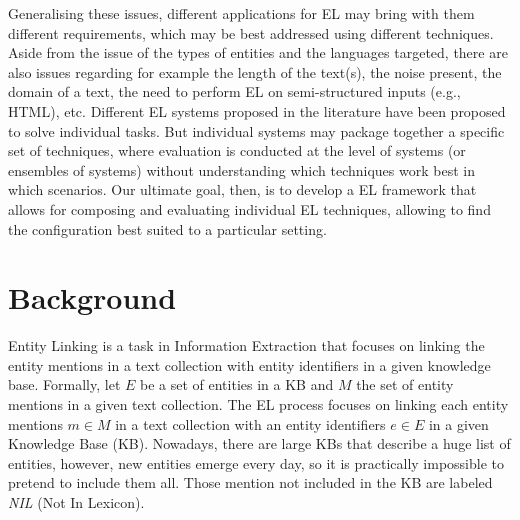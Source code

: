 \documentclass[sigconf]{acmart}
\begin{document}
Generalising these issues, different applications for EL may bring with them different requirements, which may be best addressed using different techniques. Aside from the issue of the types of entities and the languages targeted, there are also issues regarding for example the length of the text(s), the noise present, the domain of a text, the need to perform EL on semi-structured inputs (e.g., HTML), etc. Different EL systems proposed in the literature have been proposed to solve individual tasks. But individual systems may package together a specific set of techniques, where evaluation is conducted at the level of systems (or ensembles of systems) without understanding which techniques work best in which scenarios. Our ultimate goal, then, is to develop a EL framework that allows for composing and evaluating individual EL techniques, allowing to find the configuration best suited to a particular setting.



\section{Background}
Entity Linking is a task in Information Extraction that focuses on linking the entity mentions in a text collection with entity identifiers in a given knowledge base. Formally, let $E$ be a set of entities in a KB and $M$ the set of entity mentions in a given text collection. The EL process focuses on linking each entity mentions $m\in{}M$ in a text collection with an entity identifiers $e\in{}E$ in a given Knowledge Base (KB). Nowadays, there are large KBs that describe a huge list of entities, however, new entities emerge every day, so it is practically impossible to pretend to include them all. Those mention not included in the KB are labeled \textit{NIL} (Not In Lexicon).
\end{document}

